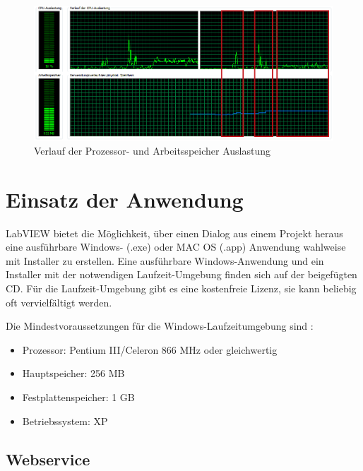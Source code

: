 	\begin{figure}%
	\centering
		\includegraphics[width=\textwidth]{Pics/test04.png}
	\caption{Verlauf der Prozessor- und Arbeitsspeicher Auslastung}
	\label{fig:test}
	\end{figure}




\section{Einsatz der Anwendung}
LabVIEW bietet die Möglichkeit, über einen Dialog aus einem Projekt heraus eine ausführbare Windows- (.exe) oder MAC OS (.app) Anwendung wahlweise mit Installer zu erstellen. 
Eine ausführbare Windows-Anwendung und ein Installer mit der notwendigen Laufzeit-Umgebung finden sich auf der beigefügten CD. 
Für die Laufzeit-Umgebung gibt es eine kostenfreie Lizenz, sie kann beliebig oft vervielfältigt werden.

Die Mindestvoraussetzungen für die Windows-Laufzeitumgebung sind \cite{ni-min}: 
\begin{itemize}
\item Prozessor: Pentium III/Celeron 866 MHz oder gleichwertig
\item Hauptspeicher: 256 MB
\item Festplattenspeicher: 1 GB
\item Betriebssystem: XP
\end{itemize}

\subsection{Webservice}


